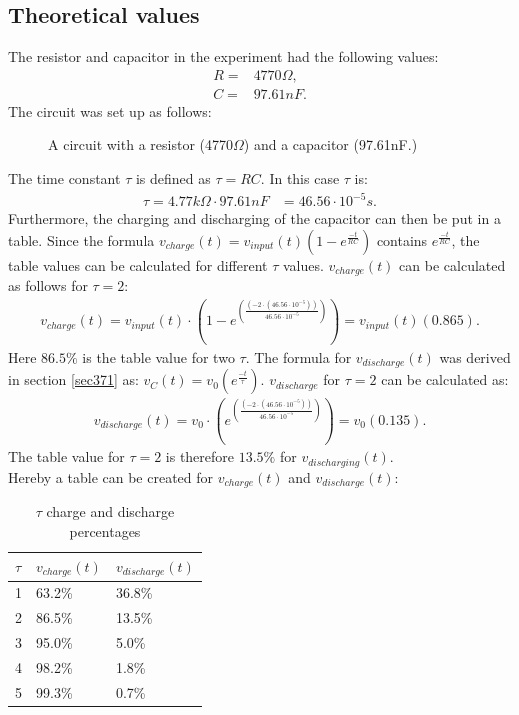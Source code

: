 \subsection{Theoretical values}
The resistor and capacitor in the experiment had the following values:
\begin{align*}
 R =& 4770\Omega, \\
 C =& 97.61nF.
\end{align*}
The circuit was set up as follows:
\begin{figure}[H]
	
	\caption{A circuit with a resistor (4770$\Omega$) and a capacitor (97.61nF.)}
\end{figure}
\noindent The time constant $\tau$ is defined as $\tau = RC$. In this case $\tau$ is:
\begin{align}
	\tau = 4.77 k\Omega \cdot 97.61 nF &= 46.56 \cdot 10^{-5} s. \label{eq:tau}
\end{align}
Furthermore, the charging and discharging of the capacitor can then be put in a table. Since the formula $v_{charge}(t)=v_{input}(t)\left(1-e^{\frac{-t}{RC}}\right)$ contains $e^{\frac{-t}{RC}}$, the table values can be calculated for different $\tau$ values. $v_{charge}(t)$ can be calculated as follows for $\tau = 2$: 
\begin{align*}
v_{charge}(t)=v_{input}(t) \cdot \left(1-e^{\left(\frac{\left(-2 \cdot \left(46.56 \cdot 10^{-5} \right)\right)}{46.56 \cdot 10^{-5}}\right)} \right) = v_{input}(t)(0.865).
\end{align*}
Here $86.5\%$ is the table value for two $\tau$. The formula for $v_{discharge}(t)$ was derived in section \ref{sec371} as: $v_{C}(t)=v_{0} \left(e^{\frac{-t}{\tau}} \right)$. $v_{discharge}$ for $\tau = 2$ can be calculated as:
\begin{align*}
v_{discharge}(t)=v_{0} \cdot \left(e^{\left(\frac{\left(-2 \cdot \left(46.56 \cdot 10^{-5} \right)\right)}{46.56 \cdot 10^{-5}}\right)} \right) = v_{0}(0.135).
\end{align*}
The table value for $\tau = 2$ is therefore $13.5 \%$ for $v_{discharging}(t)$. \\
Hereby a table can be created for $v_{charge}(t)$ and $v_{discharge}(t)$: \\
\begin{table}[H]
\center
\begin{tabular}{|l|l|l|}
\hline
$\tau$ & $v_{charge}(t)$ & $v_{discharge}(t)$ \\ \hline
1      & 63.2\%       & 36.8\%         \\ \hline
2      & 86.5\%       & 13.5\%         \\ \hline
3      & 95.0\%       & 5.0\%          \\ \hline
4      & 98.2\%       & 1.8\%          \\ \hline
5      & 99.3\%       & 0.7\%          \\ \hline
\end{tabular}
\caption{$\tau$ charge and discharge percentages}
\end{table}
